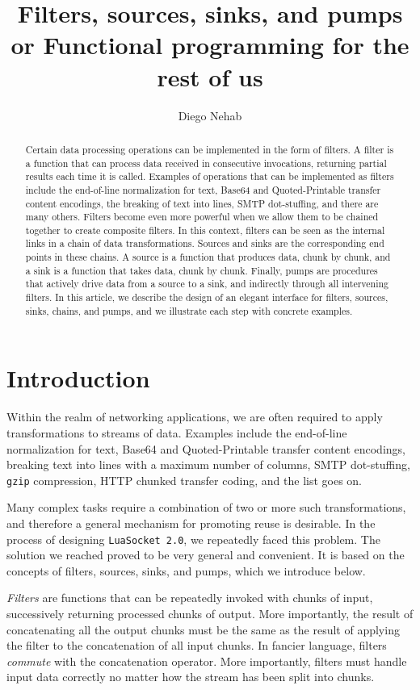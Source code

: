 \documentclass[10pt]{article}
\title{Filters, sources, sinks, and pumps\\
      {\large or Functional programming for the rest of us}}
\author{Diego Nehab}
\begin{document}
\maketitle

\begin{abstract}
Certain data processing operations can be implemented in the
form of filters. A filter is a function that can process
data received in consecutive invocations, returning partial
results each time it is called.  Examples of operations that
can be implemented as filters include the end-of-line
normalization for text, Base64 and Quoted-Printable transfer
content encodings, the breaking of text into lines, SMTP
dot-stuffing, and there are many others.  Filters become
even more powerful when we allow them to be chained together
to create composite filters. In this context, filters can be
seen as the internal links in a chain of data transformations.
Sources and sinks are the corresponding end points in these
chains. A source is a function that produces data, chunk by
chunk, and a sink is a function that takes data, chunk by
chunk. Finally, pumps are procedures that actively drive
data from a source to a sink, and indirectly through all 
intervening filters.  In this article, we describe the design of an
elegant interface for filters, sources, sinks, chains, and
pumps, and we illustrate each step with concrete examples. 
\end{abstract}

\section{Introduction}

Within the realm of networking applications, we are often
required to apply transformations to streams of data. Examples
include the end-of-line normalization for text, Base64 and
Quoted-Printable transfer content encodings, breaking text
into lines with a maximum number of columns, SMTP
dot-stuffing, \texttt{gzip} compression, HTTP chunked
transfer coding, and the list goes on.

Many complex tasks require a combination of two or more such
transformations, and therefore a general mechanism for
promoting reuse is desirable. In the process of designing
\texttt{LuaSocket~2.0}, we repeatedly faced this problem.
The solution we reached proved to be very general and
convenient. It is based on the concepts of filters, sources,
sinks, and pumps, which we introduce below. 

\emph{Filters} are functions that can be repeatedly invoked
with chunks of input, successively returning processed
chunks of output. More importantly, the result of
concatenating all the output chunks must be the same as the
result of applying the filter to the concatenation of all
input chunks. In fancier language, filters \emph{commute}
with the concatenation operator. More importantly, filters
must handle input data correctly no matter how the stream
has been split into chunks. 
\end{document}
